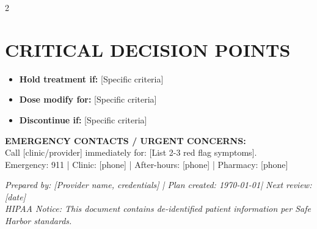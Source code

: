 \documentclass[10pt,letterpaper]{article}
\begin{document}
\begin{multicols}{2}
\section*{CRITICAL DECISION POINTS}
{\small
\begin{itemize}
    \item \textbf{Hold treatment if:} [Specific criteria]
    \item \textbf{Dose modify for:} [Specific criteria]
    \item \textbf{Discontinue if:} [Specific criteria]
\end{itemize}
}

\end{multicols}

\vspace{4pt}

\begin{tcolorbox}[
    colback=yellow!10,
    colframe=red!60!black,
    boxrule=0.8pt,
    arc=2pt,
    left=4pt,right=4pt,top=3pt,bottom=3pt,
    fontupper=\small\bfseries
]
\textbf{EMERGENCY CONTACTS / URGENT CONCERNS:} \\
{\small\normalfont
Call [clinic/provider] immediately for: [List 2-3 red flag symptoms]. \\
Emergency: 911 | Clinic: [phone] | After-hours: [phone] | Pharmacy: [phone]
}
\end{tcolorbox}

\vspace{6pt}

{\footnotesize\textit{
Prepared by: [Provider name, credentials] | Plan created: \today | Next review: [date] \\
HIPAA Notice: This document contains de-identified patient information per Safe Harbor standards.
}}
\end{document}
